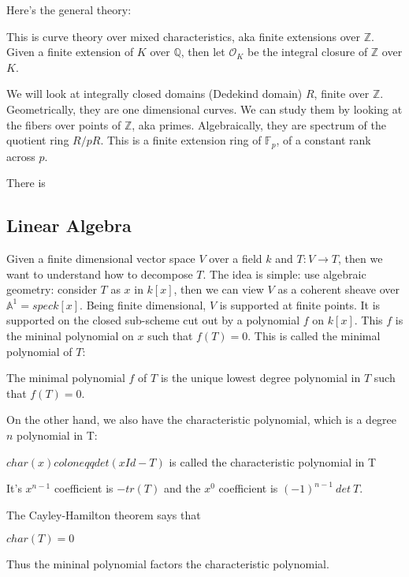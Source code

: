 \documentclass[main.tex]{subfiles}
\begin{document}
Here's the general theory: 

This is curve theory over mixed characteristics, aka finite extensions over $\mathbb{Z}$. Given a finite extension of $K$ over $\mathbb{Q}$, then let $\mathcal{O}_K$ be the integral closure of $\mathbb{Z}$ over $K$.

We will look at integrally closed domains (Dedekind domain) $R$, finite over $\mathbb{Z}$. Geometrically, they are one dimensional curves. We can study them by looking at the fibers over points of $\mathbb{Z}$, aka primes. Algebraically, they are spectrum of the quotient ring $R/pR$. This is a finite extension ring of $\mathbb{F}_p$, of a constant rank across $p$.

There is 



\subsection{Linear Algebra}


Given a finite dimensional vector space $V$ over a field $k$ and $T: V \rightarrow T$, then we want to understand how to decompose $T$. The idea is simple: use algebraic geometry: consider $T$ as $x$ in $k[x]$, then we can view $V$ as a coherent sheave over $\mathbb{A}^1 = spec k[x]$. Being finite dimensional, $V$ is supported at finite points. It is supported on the closed sub-scheme cut out by a polynomial $f$ on $k[x]$. This $f$ is the mininal polynomial on $x$ such that $f(T) = 0$. This is called the minimal polynomial of $T$: 

\begin{definition}
The minimal polynomial $f$ of $T$ is the unique lowest degree polynomial in $T$ such that $f(T) = 0$.
\end{definition}

On the other hand, we also have the characteristic polynomial, which is a degree $n$ polynomial in T:
\begin{definition}
$char(x) coloneqq det (xId - T)$ is called the characteristic polynomial in T
\end{definition}

It's $x^{n-1}$ coefficient is $-tr(T)$ and the $x^0$ coefficient is $(-1)^{n-1} \ det \ T$. 

The Cayley-Hamilton theorem says that 
\begin{theorem}
$char(T) = 0$
\end{theorem}
Thus the mininal polynomial factors the characteristic polynomial.
\end{document}

